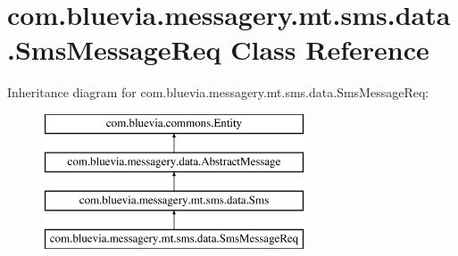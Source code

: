 \hypertarget{classcom_1_1bluevia_1_1messagery_1_1mt_1_1sms_1_1data_1_1SmsMessageReq}{
\section{com.bluevia.messagery.mt.sms.data.SmsMessageReq Class Reference}
\label{classcom_1_1bluevia_1_1messagery_1_1mt_1_1sms_1_1data_1_1SmsMessageReq}
}
Inheritance diagram for com.bluevia.messagery.mt.sms.data.SmsMessageReq:\begin{figure}[H]
\begin{center}
\leavevmode
\includegraphics[height=4.000000cm]{classcom_1_1bluevia_1_1messagery_1_1mt_1_1sms_1_1data_1_1SmsMessageReq}
\end{center}
\end{figure}
